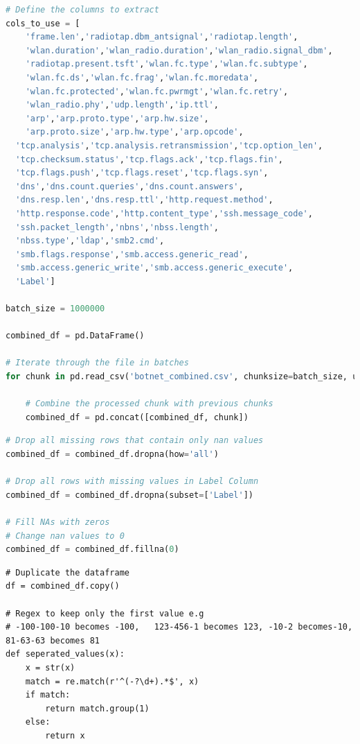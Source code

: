 \begin{appendices}
\begin{lstlisting}[language=Python]
# Define the columns to extract
cols_to_use = [
	'frame.len','radiotap.dbm_antsignal','radiotap.length', 
	'wlan.duration','wlan_radio.duration','wlan_radio.signal_dbm', 
	'radiotap.present.tsft','wlan.fc.type','wlan.fc.subtype', 
	'wlan.fc.ds','wlan.fc.frag','wlan.fc.moredata',
	'wlan.fc.protected','wlan.fc.pwrmgt','wlan.fc.retry',
	'wlan_radio.phy','udp.length','ip.ttl',
	'arp','arp.proto.type','arp.hw.size',
	'arp.proto.size','arp.hw.type','arp.opcode',
  'tcp.analysis','tcp.analysis.retransmission','tcp.option_len',
  'tcp.checksum.status','tcp.flags.ack','tcp.flags.fin',
  'tcp.flags.push','tcp.flags.reset','tcp.flags.syn',
  'dns','dns.count.queries','dns.count.answers',
  'dns.resp.len','dns.resp.ttl','http.request.method',
  'http.response.code','http.content_type','ssh.message_code',
  'ssh.packet_length','nbns','nbss.length',
  'nbss.type','ldap','smb2.cmd',
  'smb.flags.response','smb.access.generic_read',
  'smb.access.generic_write','smb.access.generic_execute',
  'Label']

batch_size = 1000000

combined_df = pd.DataFrame()

# Iterate through the file in batches
for chunk in pd.read_csv('botnet_combined.csv', chunksize=batch_size, usecols=cols_to_use, low_memory=False):
    
    # Combine the processed chunk with previous chunks
    combined_df = pd.concat([combined_df, chunk])
\end{lstlisting}

\begin{lstlisting}[language=Python,linewidth=\textwidth]
# Drop all missing rows that contain only nan values
combined_df = combined_df.dropna(how='all')

# Drop all rows with missing values in Label Column
combined_df = combined_df.dropna(subset=['Label'])

# Fill NAs with zeros
# Change nan values to 0
combined_df = combined_df.fillna(0)
\end{lstlisting}

\newpage
\begin{lstlisting}
# Duplicate the dataframe
df = combined_df.copy()

# Regex to keep only the first value e.g 
# -100-100-10 becomes -100,   123-456-1 becomes 123, -10-2 becomes-10, 81-63-63 becomes 81
def seperated_values(x):
    x = str(x)
    match = re.match(r'^(-?\d+).*$', x)
    if match:
        return match.group(1)
    else:
        return x


\end{lstlisting}
\end{appendices}
